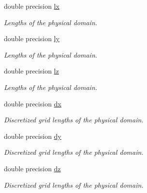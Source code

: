 \textbf{ }\par
\begin{DoxyCompactItemize}
\item 
double precision \mbox{\hyperlink{namespacemodule__global_a6ec7be7ac910713bd6e534fdf4f035f6}{lx}}
\begin{DoxyCompactList}\small\item\em Lengths of the physical domain. \end{DoxyCompactList}\item 
double precision \mbox{\hyperlink{namespacemodule__global_aea3b69a2a192a66afaa68c23a41a4c04}{ly}}
\begin{DoxyCompactList}\small\item\em Lengths of the physical domain. \end{DoxyCompactList}\item 
double precision \mbox{\hyperlink{namespacemodule__global_a6634b2eeafed254b5e008f5f0c8d2660}{lz}}
\begin{DoxyCompactList}\small\item\em Lengths of the physical domain. \end{DoxyCompactList}\end{DoxyCompactItemize}

\textbf{ }\par
\begin{DoxyCompactItemize}
\item 
double precision \mbox{\hyperlink{namespacemodule__global_ac9f59881b3d1a132a79c38005a3327b0}{dx}}
\begin{DoxyCompactList}\small\item\em Discretized grid lengths of the physical domain. \end{DoxyCompactList}\item 
double precision \mbox{\hyperlink{namespacemodule__global_ad57f0245662462006b209450d8d16e06}{dy}}
\begin{DoxyCompactList}\small\item\em Discretized grid lengths of the physical domain. \end{DoxyCompactList}\item 
double precision \mbox{\hyperlink{namespacemodule__global_ac6cde152bc0a2bd48b727bfe326c68ff}{dz}}
\begin{DoxyCompactList}\small\item\em Discretized grid lengths of the physical domain. \end{DoxyCompactList}\end{DoxyCompactItemize}



